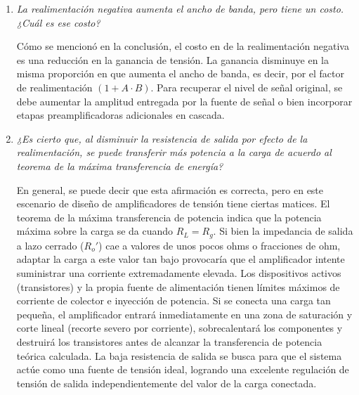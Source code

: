 \begin{enumerate}[label=\alph*)]
    El aumento de la impedancia de entrada a lazo cerrado ($Z_i'$) se puede corroborar experimentalmente repitiendo el procedimiento del Experimento 2, pero manteniendo el lazo de realimentación activo (jumper $J$ cerrado). 
    En esta condición, se observará que la resistencia variable de entrada ($R_{e1}$) necesaria para reducir la tensión de salida a la mitad de su valor original será significativamente mayor que a lazo abierto. Esto se debe a que la realimentación serie introduce una tensión proporcional a la salida que se resta a la excitación, haciendo que la corriente demandada al generador sea muy inferior, lo que se traduce en una impedancia de entrada marcadamente superior:
    \begin{equation}
        Z_i' = Z_i \cdot (1 + A \cdot B)
    \end{equation}
    
    \item \textit{La realimentación negativa aumenta el ancho de banda, pero tiene un costo. ¿Cuál es ese costo?}
    
    Cómo se mencionó en la conclusión, el costo en de la realimentación negativa
    es una reducción en la ganancia de tensión. La
    ganancia disminuye en la misma proporción en que aumenta el ancho de
    banda, es decir, por el factor de realimentación $(1 + A \cdot B)$. Para
    recuperar el nivel de señal original, se debe aumentar la amplitud
    entregada por la fuente de señal o bien incorporar etapas
    preamplificadoras adicionales en cascada.

    \item \textit{¿Es cierto que, al disminuir la resistencia de salida por efecto de la realimentación, se puede transferir más potencia a la carga de acuerdo al teorema de la máxima transferencia de energía?}
    
    En general, se puede decir que esta afirmación es correcta, pero en este escenario de diseño de amplificadores de tensión tiene ciertas matices. El teorema de la máxima transferencia de potencia indica que la potencia máxima sobre la carga se da cuando $R_L = R_g$. Si bien la impedancia de salida a lazo cerrado ($R_o'$) cae a valores de unos pocos ohms o fracciones de ohm, adaptar la carga a este valor tan bajo provocaría que el amplificador intente suministrar una corriente extremadamente elevada.
    Los dispositivos activos (transistores) y la propia fuente de alimentación tienen límites máximos de corriente de colector e inyección de potencia. Si se conecta una carga tan pequeña, el amplificador entrará inmediatamente en una zona de saturación y corte lineal (recorte severo por corriente), sobrecalentará los componentes y destruirá los transistores antes de alcanzar la transferencia de potencia teórica calculada.
    La baja resistencia de salida se busca para que el sistema actúe como una fuente de tensión ideal, logrando una excelente regulación de tensión de salida independientemente del valor de la carga conectada.
\end{enumerate}

